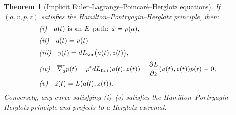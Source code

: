 \documentclass[11pt,a4paper]{article}
\newtheorem{theorem}{Theorem}[section]
\theoremstyle{definition}
\begin{document}
\begin{theorem}[Implicit Euler--Lagrange--Poincar\'e--Herglotz equations]
\label{thm:implicit_ELP_Herglotz}
If $(a,v,p,z)$ satisfies the Hamilton--Pontryagin--Herglotz principle,
then:
\begin{equation}\label{eq:implicit_HPH_final_corrected}
\begin{aligned}
&\text{\em (i)}\quad a(t)\ \text{is an $E$–path: } \dot x=\rho(a),\\[0.2em]
&\text{\em (ii)}\quad a(t)=v(t),\\[0.2em]
&\text{\em (iii)}\quad p(t)=dL_{\mathrm{ver}}\big(a(t),z(t)\big),\\[0.2em]
&\text{\em (iv)}\quad
\overline{\nabla}_{a}^{*}p (t) - \rho^{*}dL_{\mathrm{hor}}(a(t),z(t)) - \frac{\partial L}{\partial z}(a(t),z(t)) p(t) = 0,\\[0.2em]
&\text{\em (v)}\quad \dot z(t)=L(a(t),z(t)).
\end{aligned}
\end{equation}
Conversely, any curve satisfying (i)--(v) satisfies the
Hamilton--Pontryagin--Herglotz principle and projects to a Herglotz
extremal.
\end{theorem}
\end{document}

